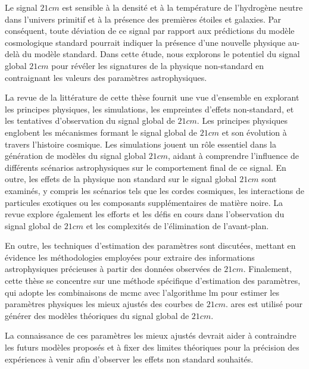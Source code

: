 \documentclass[12pt, TexShade, letterpaper]{report}
\begin{document}
Le signal $21cm$ est sensible à la densité et à la température de l'hydrogène neutre dans l'univers primitif et à la présence des premières étoiles et galaxies. Par conséquent, toute déviation de ce signal par rapport aux prédictions du modèle cosmologique standard pourrait indiquer la présence d'une nouvelle physique au-delà du modèle standard. Dans cette étude, nous explorons le potentiel du signal global $21cm$ pour révéler les signatures de la physique non-standard en contraignant les valeurs des paramètres astrophysiques. \par

La revue de la littérature de cette thèse fournit une vue d'ensemble en explorant les principes physiques, les simulations, les empreintes d'effets non-standard, et les tentatives d'observation du signal global de $21cm$. Les principes physiques englobent les mécanismes formant le signal global de $21cm$ et son évolution à travers l'histoire cosmique. Les simulations jouent un rôle essentiel dans la génération de modèles du signal global $21cm$, aidant à comprendre l'influence de différents scénarios astrophysiques sur le comportement final de ce signal. En outre, les effets de la physique non standard sur le signal global $21cm$ sont examinés, y compris les scénarios tels que les cordes cosmiques, les interactions de particules exotiques ou les composants supplémentaires de matière noire. La revue explore également les efforts et les défis en cours dans l'observation du signal global de $21cm$ et les complexités de l'élimination de l'avant-plan. \par

En outre, les techniques d'estimation des paramètres sont discutées, mettant en évidence les méthodologies employées pour extraire des informations astrophysiques précieuses à partir des données observées de $21cm$. Finalement, cette thèse se concentre sur une méthode spécifique d'estimation des paramètres, qui adopte les combinaisons de \gls{mcmc} avec l'algorithme \gls{lm} pour estimer les paramètres physiques les mieux ajustés des courbes de $21cm$. \gls{ares} est utilisé pour générer des modèles théoriques du signal global de $21cm$.\par

La connaissance de ces paramètres les mieux ajustés devrait aider à contraindre les futurs modèles proposés et à fixer des limites théoriques pour la précision des expériences à venir afin d'observer les effets non standard souhaités.\par
\end{document}
